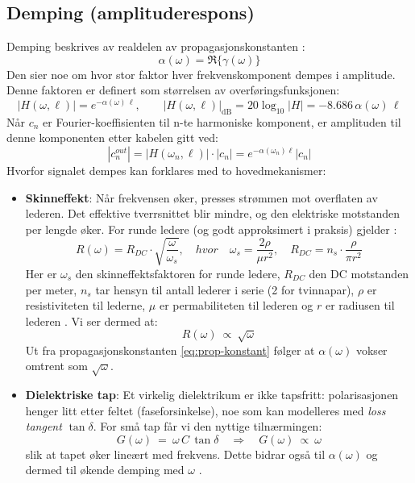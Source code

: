\clearpage
\subsection{Demping (amplituderespons)}
Demping beskrives av realdelen av propagasjonskonstanten \cite{HaytBuck2018}:
\[ 
  \alpha(\omega)=\Re\{\gamma(\omega)\}
\]
Den sier noe om hvor stor faktor hver frekvenskomponent dempes i amplitude. Denne faktoren er definert som størrelsen av overføringsfunksjonen:
\[
|H(\omega,\ell)|=e^{-\alpha(\omega)\,\ell}, \qquad |H(\omega,\ell)|_{\mathrm{dB}} = 20\log_{10}|H| = -8.686\,\alpha(\omega)\,\ell
\]
Når $c_n$ er Fourier-koeffisienten til n-te harmoniske komponent, er amplituden til denne komponenten etter kabelen gitt ved:
\[
|c_n^{out}| = |H(\omega_n,\ell)| \cdot |c _n| = e^{-\alpha(\omega_n) \ell} |c_n|
\]
Hvorfor signalet dempes kan forklares med to hovedmekanismer:\\
\begin{itemize}[leftmargin=2.8em,style=nextline]
  \item \textbf{Skinneffekt}: Når frekvensen øker, presses strømmen mot overflaten av lederen. Det effektive tverrsnittet blir mindre, og den elektriske motstanden per lengde øker. For runde ledere (og godt approksimert i praksis) gjelder :
    \begin{equation}
        R(\omega) = R_{DC} \cdot \sqrt{\frac{\omega}{\omega_{s}}}, \quad hvor \quad \omega_{s} = \frac{2 \rho}{ \mu r^2}, \quad R_{DC} = n_s \cdot \frac{\rho}{\pi r^2}
        \label{eq:skin-effekt}
    \end{equation}
    Her er $\omega_{s}$ den skinneffektsfaktoren for runde ledere, $R_{DC}$ den DC motstanden per meter, $n_s$ tar hensyn til antall lederer i serie (2 for tvinnapar), $\rho$ er resistiviteten til lederne, $\mu$ er permabiliteten til lederen og $r$ er radiusen til lederen \cite{PalermoLecture2023}. Vi ser dermed at:
    \[
    R(\omega)\ \propto\ \sqrt{\omega}
    \]
  Ut fra propagasjonskonstanten \eqref{eq:prop-konstant} følger at $\alpha(\omega)$ vokser omtrent som $\sqrt{\omega}$.\\
  \item \textbf{Dielektriske tap}: Et virkelig dielektrikum er ikke tapsfritt: polarisasjonen henger litt etter feltet (faseforsinkelse), noe som kan modelleres med \emph{loss tangent} \(\tan\delta\). For små tap får vi den nyttige tilnærmingen:
  \begin{equation}
  G(\omega)\ =\ \omega\,C\,\tan\delta \quad \Rightarrow \quad G(\omega)\ \propto\ \omega
    \label{eq:dielectric_loss}
  \end{equation}
  slik at tapet øker lineært med frekvens. Dette bidrar også til \(\alpha(\omega)\) og dermed til økende demping med \(\omega\) \cite{PalermoLecture2023}.\\
\end{itemize}
\clearpage

